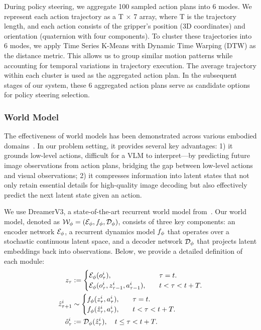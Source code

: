  During policy steering, we aggregate 100 sampled action plans into 6 modes. We represent each action trajectory as a T $\times$ 7 array, where T is the trajectory length, and each action consists of the gripper’s position (3D coordinates) and orientation (quaternion with four components). To cluster these trajectories into 6 modes, we apply Time Series K-Means with Dynamic Time Warping (DTW) as the distance metric. This allows us to group similar motion patterns while accounting for temporal variations in trajectory execution. The average trajectory within each cluster is used as the aggregated action plan. In the subsequent stages of our system, these 6 aggregated action plans serve as candidate options for policy steering selection.
\\

\subsubsection{World Model}\hfill 

\label{sec:appendix_world_model}
 The effectiveness of world models has been demonstrated across various embodied domains~\citep{liumulti,wu2023daydreamer}. In our problem setting, it provides several key advantages: 1) it grounds low-level actions, difficult for a VLM to interpret—by predicting future image observations from action plans, bridging the gap between low-level actions and visual observations; 2) it compresses information into latent states that not only retain essential details for high-quality image decoding but also effectively predict the next latent state given an action. 

 We use DreamerV3, a state-of-the-art recurrent world model from~\citep{hafner2023mastering}. Our world model, denoted as $\mathcal{W}_\phi = (\mathcal{E}_\phi, f_\phi, \mathcal{D}_\phi)$, consists of three key components: an encoder network $\mathcal{E}_\phi$, a recurrent dynamics model $f_\phi$ that operates over a stochastic continuous latent space, and a decoder network $\mathcal{D}_\phi$ that projects latent embeddings back into observations. Below, we provide a detailed definition of each module:
\begin{align}
\label{eq:encoder}
z_\tau &:= 
\begin{cases} 
\mathcal{E}_\phi(o_\tau^i), & \quad \tau = t. \\ 
\mathcal{E}_\phi(o_\tau^i, z_{\tau-1}^i, a_{\tau-1}^i), & \quad t < \tau < t + T .
\end{cases} \\
\label{eq:dyancmis}
\hat{z}_{\tau+1}^i &\sim
\begin{cases} 
f_\phi(z_\tau^i, a_\tau^i), & \quad \tau = t. \\ 
f_\phi(\hat{z}_\tau^i, a_\tau^i), & \quad t < \tau < t + T. 
\end{cases} \\
\label{eq:decoder}
\hat{o}^i_\tau &:= \mathcal{D}_\phi(\hat{z}_\tau^i), \quad t \leq \tau < t + T .
\end{align}

